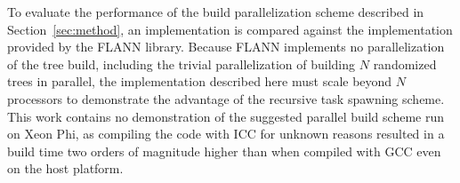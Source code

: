 
 To evaluate the performance of the build parallelization scheme described in Section~\ref{sec:method}, an implementation is compared against the implementation provided by the FLANN library. Because FLANN implements no parallelization of the tree build, including the trivial parallelization of building $N$ randomized trees in parallel, the implementation described here must scale beyond $N$ processors to demonstrate the advantage of the recursive task
spawning scheme. This work contains no demonstration of the suggested parallel build scheme run on Xeon Phi, as compiling the code with ICC for unknown reasons resulted in a build time two orders of magnitude higher than when compiled with GCC even on the host platform.

